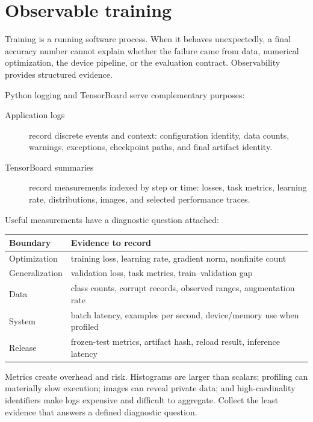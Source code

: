 \section{Observable training}

Training is a running software process. When it behaves unexpectedly, a final
accuracy number cannot explain whether the failure came from data, numerical
optimization, the device pipeline, or the evaluation contract. Observability
provides structured evidence.

Python logging and TensorBoard serve complementary purposes:

\begin{description}
  \item[Application logs] record discrete events and context: configuration
  identity, data counts, warnings, exceptions, checkpoint paths, and final
  artifact identity.
  \item[TensorBoard summaries] record measurements indexed by step or time:
  losses, task metrics, learning rate, distributions, images, and selected
  performance traces.
\end{description}

Useful measurements have a diagnostic question attached:

\begin{center}
\begin{tabular}{p{}p{}}
\toprule
Boundary & Evidence to record \\
\midrule
Optimization & training loss, learning rate, gradient norm, nonfinite count \\
Generalization & validation loss, task metrics, train--validation gap \\
Data & class counts, corrupt records, observed ranges, augmentation rate \\
System & batch latency, examples per second, device/memory use when profiled \\
Release & frozen-test metrics, artifact hash, reload result, inference latency \\
\bottomrule
\end{tabular}
\end{center}

Metrics create overhead and risk. Histograms are larger than scalars;
profiling can materially slow execution; images can reveal private data; and
high-cardinality identifiers make logs expensive and difficult to aggregate.
Collect the least evidence that answers a defined diagnostic question.

